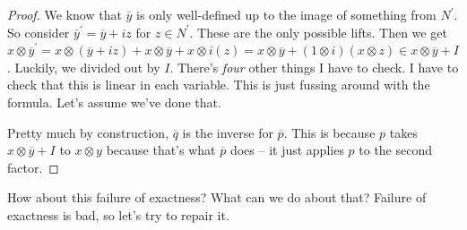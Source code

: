 \documentclass{amsart}
\theoremstyle{theorem}
\theoremstyle{definition}
\begin{document}
\begin{enumerate}
\begin{proof}
We know that $\overline{y}$ is only well-defined up to the image of something from $N^\prime$. So consider $\overline{y}^\prime=\overline{y}+iz$ for $z\in N^\prime$. These are the only possible lifts. Then we get $x\otimes\overline{y}^\prime=x\otimes(\overline{y}+iz)+x\otimes\overline{y}+x\otimes i(z)=x\otimes\overline{y}+(1\otimes i)(x\otimes z)\in x\otimes\overline{y}+I$. Luckily, we divided out by $I$. There's \emph{four} other things I have to check. I have to check that this is linear in each variable. This is just fussing around with the formula. Let's assume we've done that.

Pretty much by construction, $\overline{q}$ is the inverse for $\overline{p}$. This is because $p$ takes $x\otimes\overline{y}+I$ to $x\otimes y$ because that's what $\overline{p}$ does -- it just applies $p$ to the second factor. 
\end{proof}
\end{enumerate}
How about this failure of exactness? What can we do about that? Failure of exactness is bad, so let's try to repair it.
\end{document}
